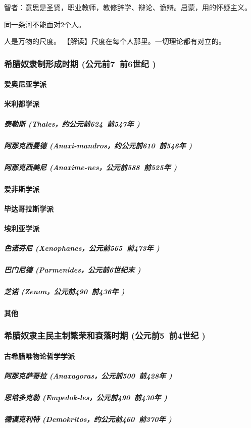 \documentclass[UTF8]{../RepresentationUniverse}
\begin{document}
    智者：意思是圣贤，职业教师，教修辞学、辩论、诡辩。启蒙，用的怀疑主义。

    同一条河不能面对2个人。

    人是万物的尺度。
    【解读】尺度在每个人那里。一切理论都有对立的。


    \subsubsection{希腊奴隶制形成时期 (公元前7~前6世纪 )}
        \paragraph{爱奥尼亚学派}
        \paragraph{米利都学派}
            \subparagraph{泰勒斯 (Thales，约公元前624~前547年 )}
            \subparagraph{阿那克西曼德 (Anaxi-mandros，约公元前610~前546年 )}
            \subparagraph{阿那克西美尼 (Anaxime-nes，公元前588~前525年 )}
        \paragraph{爱非斯学派}
        \paragraph{毕达哥拉斯学派}
        \paragraph{埃利亚学派}
            \subparagraph{色诺芬尼 (Xenophanes，公元前565~前473年 )}
            \subparagraph{巴门尼德 (Parmenides，公元前6世纪末 )}
            \subparagraph{芝诺 (Zenon，公元前490~前436年 )}
        \paragraph{其他}

    \subsubsection{希腊奴隶主民主制繁荣和衰落时期 (公元前5~前4世纪 )}
        \paragraph{古希腊唯物论哲学学派}
            \subparagraph{阿那克萨哥拉 (Anaxagoras，公元前500~前428年 )}
            \subparagraph{恩培多克勒 (Empedok-les，公元前490~前430年 )}
            \subparagraph{德谟克利特 (Demokritos，约公元前460~前370年 )}
\end{document}
